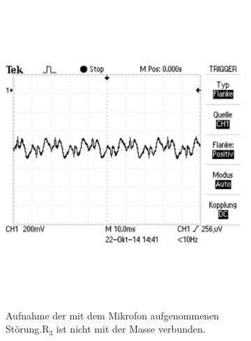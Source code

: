 \documentclass[12pt,a4paper]{article}
\begin{document}
\begin{figure}[H]
        \centering
        \begin{subfigure}[tb]{0.48\textwidth}
                \includegraphics[width=\textwidth , scale = 0.4]{2_3_r3np_st.pdf}
				\caption[Aufnahme der mit dem Mikrofon aufgenommenen Störung.R$_3$ ist nicht mit der Masse verbunden.]{Aufnahme der mit dem Mikrofon aufgenommenen Störung.R$_3$ ist nicht mit der Masse verbunden.}
 	 			\label{fig:2_3_r3np_st}
        \end{subfigure}%
        \hfill
        \begin{subfigure}[tb]{0.48\textwidth}

\end{subfigure}
\end{figure}
\end{document}

